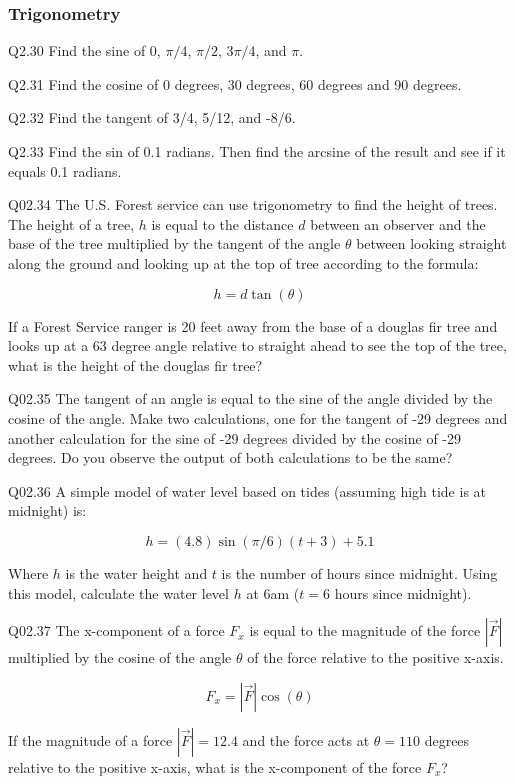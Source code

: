 \documentclass{book}
\newenvironment{problems}{}{}  %
\begin{document}
    
        \begin{problems}
        \subsubsection{Trigonometry}\label{trigonometry}

Q2.30 Find the sine of \(0\), \(\pi/4\), \(\pi/2\), \(3\pi/4\), and
\(\pi\).

Q2.31 Find the cosine of 0 degrees, 30 degrees, 60 degrees and 90
degrees.

Q2.32 Find the tangent of 3/4, 5/12, and -8/6.

Q2.33 Find the sin of 0.1 radians. Then find the arcsine of the result
and see if it equals 0.1 radians.

Q02.34 The U.S. Forest service can use trigonometry to find the height
of trees. The height of a tree, \(h\) is equal to the distance \(d\)
between an observer and the base of the tree multiplied by the tangent
of the angle \(\theta\) between looking straight along the ground and
looking up at the top of tree according to the formula:

\[ h = d\tan(\theta) \]

If a Forest Service ranger is 20 feet away from the base of a douglas
fir tree and looks up at a 63 degree angle relative to straight ahead to
see the top of the tree, what is the height of the douglas fir tree?

Q02.35 The tangent of an angle is equal to the sine of the angle divided
by the cosine of the angle. Make two calculations, one for the tangent
of -29 degrees and another calculation for the sine of -29 degrees
divided by the cosine of -29 degrees. Do you observe the output of both
calculations to be the same?

Q02.36 A simple model of water level based on tides (assuming high tide
is at midnight) is:

\[ h = (4.8)\sin(\pi/6)(t+3)+5.1 \]

Where \(h\) is the water height and \(t\) is the number of hours since
midnight. Using this model, calculate the water level \(h\) at 6am
(\(t=6\) hours since midnight).

Q02.37 The x-component of a force \(F_x\) is equal to the magnitude of
the force \(|\vec{F}|\) multiplied by the cosine of the angle \(\theta\)
of the force relative to the positive x-axis.

\[ F_x = |\vec{F}|\cos(\theta) \]

If the magnitude of a force \(|\vec{F}| = 12.4\) and the force acts at
\(\theta=110\) degrees relative to the positive x-axis, what is the
x-component of the force \(F_x\)?


\end{problems}
\end{document}
